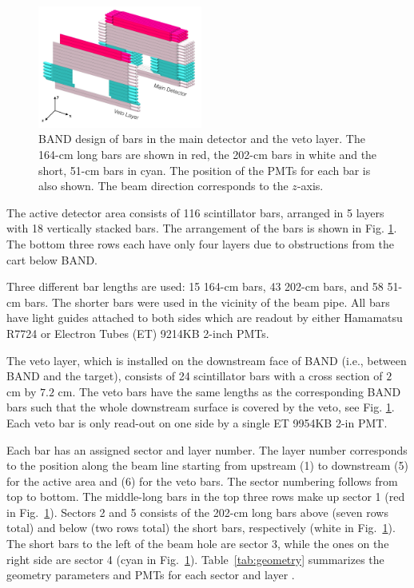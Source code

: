 \documentclass[3p,final,twocolumn]{elsarticle}
\begin{document}
\begin{figure}[tb]
	\centering
			\includegraphics[width=0.48\textwidth]{band-schematic.pdf}
            \caption{BAND design of bars in the main
                   detector and the veto layer. The 164-\si{\centi\meter} long bars are shown in
                          red, the 202-\si{\centi\meter} bars in white
                          and the short, 51-\si{\centi\meter} bars in cyan. The position of
                          the PMTs for each bar is also shown. The beam direction corresponds to the $z$-axis.   }
		\label{fig:design}
\end{figure}

The active detector area consists of 116 scintillator bars, arranged
in 5 layers with 18 vertically stacked bars. The arrangement of the
bars is shown in Fig. \ref{fig:design}. The bottom three rows each have only
four layers due to obstructions from the cart below BAND.

Three different bar lengths are used: 15 164-\si{\centi\meter} bars, 43 202-\si{\centi\meter} bars, and 58 
51-\si{\centi\meter}  bars. The shorter bars were used in the vicinity of
the beam pipe. All bars have light guides attached to both sides which
are readout by either Hamamatsu R7724 \cite{pmtR7724} or Electron
Tubes (ET) 9214KB \cite{pmt9214} 2-inch PMTs.

The veto layer, which is installed on the downstream face of BAND
(i.e., between BAND and the target),
consists of 24 scintillator bars with a cross section of $2$
\si{\centi\meter} by $7.2$ \si{\centi\meter}. The veto bars have the
same lengths as the corresponding BAND bars such that the whole
downstream surface is covered by the veto, see
Fig. \ref{fig:design}. Each veto bar is only read-out on one side by a
single ET 9954KB \cite{pmt9954} 2-in PMT.

Each bar has an assigned sector and layer number. The layer number
corresponds to the position along the beam line starting
from upstream (1) to downstream (5) for the active area and (6) for
the veto bars. The sector numbering follows from top to bottom. The
middle-long bars in the top three rows make up sector 1 (red in
Fig.~\ref{fig:design}). Sectors 2 and 5 consists of the 202-cm long bars above
(seven rows total) and below (two rows total) the short bars,
respectively (white in Fig.~\ref{fig:design}). The short bars to the
left of the beam hole are sector 3, while the ones on the right side
are sector 4 (cyan in Fig.~\ref{fig:design}).
Table~\ref{tab:geometry} summarizes the geometry parameters and PMTs
for each sector and layer .
\end{document}
